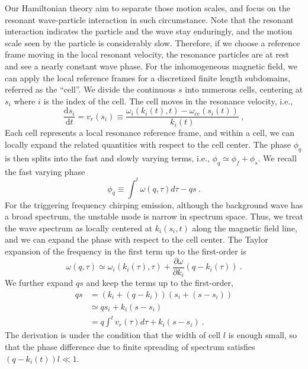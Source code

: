 Our Hamiltonian theory aim to separate those motion scales, and focus on the resonant wave-particle interaction in such circumstance.  
Note that the resonant interaction indicates the particle and the wave stay enduringly, and the motion scale seen by the particle is considerably slow. 
Therefore, if we choose a reference frame moving in the local resonant velocity, the resonance particles are at rest and see a nearly constant wave phase.
For the inhomogeneous magnetic field, we can apply the local reference frames for a discretized finite length subdomains, referred as the ``cell''.
We divide the continuous $s$ into numerous cells, centering at $s_i$ where $i$ is the index of the cell. The cell moves in the resonance velocity, i.e.,
\begin{equation}
    \frac{\mathrm{d} s_i}{\mathrm{d}t} = v_r(s_i) \equiv \frac{\omega_{i}\left(k_{i}(t), t\right)-\omega_{ce}\left(s_{i}(t)\right)}{k_{i}(t)}~,
\end{equation}
Each cell represents a local resonance reference frame, and within a cell, we can locally expand the related quantities with respect to the cell center.
The phase $\phi_q$ is then splits into the fast and slowly varying terms, i.e., $\phi_q \simeq \phi_{f} + \phi_{s}$.
We recall the fast varying phase
\begin{equation}
    \phi_q \equiv \int^t \omega(q, \tau)d\tau - q s~.
\end{equation}
For the triggering frequency chirping emission, although the background wave has a broad spectrum, the unstable mode is narrow in spectrum space.
Thus, we treat the wave spectrum as locally centered at $k_i(s_i,t)$ along the magnetic field line, and we can expand the phase with respect to the cell center.
The Taylor expansion of the frequency in the first term up to the first-order is
\begin{equation}
    \omega(q,\tau) \simeq \omega_{i}\left(k_{i}(\tau), \tau\right) + \frac{\partial \omega}{\partial k_{i}}\left(q-k_{i}(\tau)\right)~.
\end{equation}
We further expand $q s$ and keep the terms up to the first-order,
\begin{equation}
    \begin{aligned}
        q s & = (k_i + (q-k_i)) (s_i+(s-s_i))           \\
            & \simeq  q s_i + k_i (s-s_i)                 \\
            & = q \int^t v_r(\tau) d \tau  + k_i (s-s_i)~.
    \end{aligned}
\end{equation}
The derivation is under the condition that the width of cell $l$ is enough small, so that the phase difference due to finite spreading of spectrum satisfies $\left(q-k_i(t)\right) l \ll 1$.

